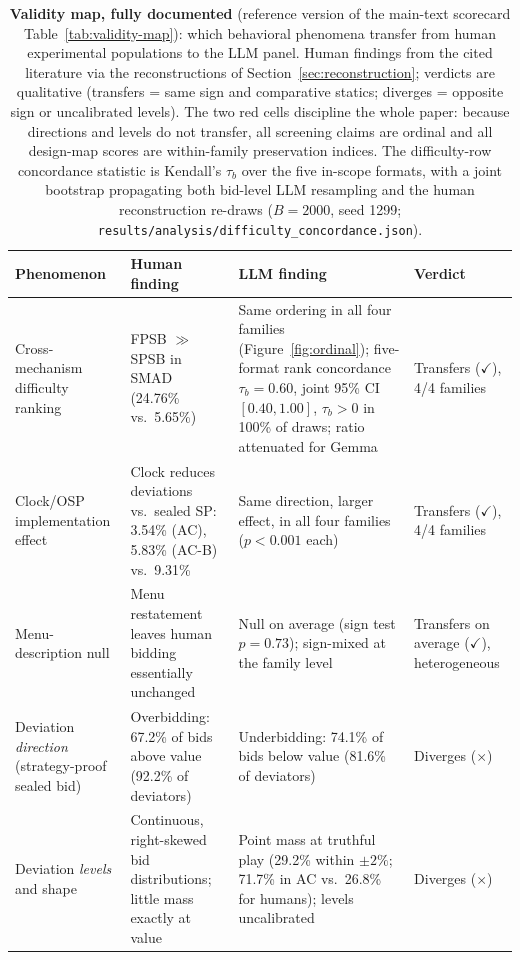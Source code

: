 \begin{table}[!htbp]
\centering
\small
\begin{tabularx}{\textwidth}{>{\raggedright\arraybackslash}p{2.55cm} >{\raggedright\arraybackslash}X >{\raggedright\arraybackslash}X >{\raggedright\arraybackslash}p{2.1cm}}
\toprule
\textbf{Phenomenon} & \textbf{Human finding} & \textbf{LLM finding} & \textbf{Verdict} \\
\midrule
Cross-mechanism difficulty ranking & FPSB $\gg$ SPSB in SMAD (24.76\% vs.\ 5.65\%) & Same ordering in all four families (Figure~\ref{fig:ordinal}); five-format rank concordance $\tau_b = 0.60$, joint 95\% CI $[0.40, 1.00]$, $\tau_b > 0$ in 100\% of draws; ratio attenuated for Gemma & Transfers ($\checkmark$), 4/4 families \\
\addlinespace
Clock/OSP implementation effect & Clock reduces deviations vs.\ sealed SP: 3.54\% (AC), 5.83\% (AC-B) vs.\ 9.31\% & Same direction, larger effect, in all four families ($p<0.001$ each) & Transfers ($\checkmark$), 4/4 families \\
\addlinespace
Menu-description null & Menu restatement leaves human bidding essentially unchanged & Null on average (sign test $p=0.73$); sign-mixed at the family level & Transfers on average ($\checkmark$), heterogeneous \\
\addlinespace
Deviation \emph{direction} (strategy-proof sealed bid) & Overbidding: 67.2\% of bids above value (92.2\% of deviators) & Underbidding: 74.1\% of bids below value (81.6\% of deviators) & Diverges ($\times$) \\
\addlinespace
Deviation \emph{levels} and shape & Continuous, right-skewed bid distributions; little mass exactly at value & Point mass at truthful play (29.2\% within $\pm2\%$; 71.7\% in AC vs.\ 26.8\% for humans); levels uncalibrated & Diverges ($\times$) \\
\bottomrule
\end{tabularx}
\caption{\textbf{Validity map, fully documented} (reference version of the main-text scorecard Table~\ref{tab:validity-map}): which behavioral phenomena transfer from human experimental populations to the LLM panel. Human findings from the cited literature via the reconstructions of Section~\ref{sec:reconstruction}; verdicts are qualitative (transfers = same sign and comparative statics; diverges = opposite sign or uncalibrated levels). The two red cells discipline the whole paper: because directions and levels do not transfer, all screening claims are ordinal and all design-map scores are within-family preservation indices. The difficulty-row concordance statistic is Kendall's $\tau_b$ over the five in-scope formats, with a joint bootstrap propagating both bid-level LLM resampling and the human reconstruction re-draws ($B=2000$, seed 1299; \texttt{results/analysis/difficulty\_concordance.json}).}
\label{tab:validity-map-full}
\end{table}


